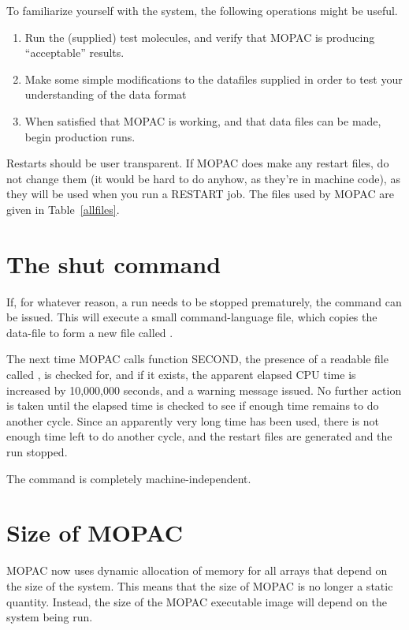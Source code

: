 To familiarize yourself with the system, the  following  operations
might be useful.
\begin{enumerate}
\item Run the (supplied) test molecules, and  verify  that  MOPAC  is producing
``acceptable'' results.
\item Make some simple modifications to  the  datafiles  supplied  in order to
test your understanding of the data format
\item  When satisfied that MOPAC is working, and that data  files  can be made,
begin production runs.
\end{enumerate}
   
Restarts should be user transparent.  If MOPAC does make any restart files, do
not change them (it would be hard  to  do  anyhow,  as they're  in  machine 
code), as they will be used when you run a RESTART job.  The files used by
MOPAC are given in Table~\ref{allfiles}.

\section{The  shut command}
If, for whatever reason, a run needs to be stopped prematurely, the command
 can be issued. This  will execute a small
command-language file, which copies the data-file to  form  a  new  file called
.

The next time MOPAC  calls  function  SECOND,  the  presence  of  a readable
file called , is checked for, and if it exists,  the 
apparent  elapsed  CPU  time  is increased  by  10,000,000  seconds,  and  a 
warning  message issued.  No further action is taken until the elapsed time 
is  checked  to  see  if enough  time remains to do another cycle.  Since an
apparently very long time has been used, there is not enough time left to do 
another  cycle, and the restart files are generated and the run stopped.

The  command is completely machine-independent.

\section{Size of MOPAC}
MOPAC now uses dynamic allocation of memory for all arrays that depend on the
size of the system. This means that the size of MOPAC is no longer a static
quantity. Instead, the size of the MOPAC executable image will depend on the
system being run. 

